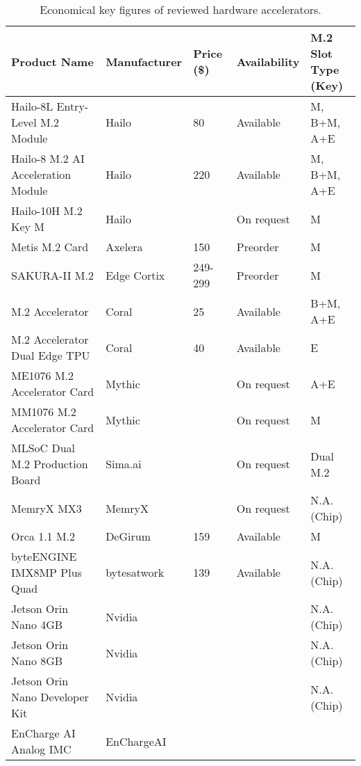 \begin{table}[!ht]
    \centering
    \begin{tabular}{|l|l|l|l|l|}
    \hline
        Product Name & Manufacturer & Price (\$) & Availability & \makecell{M.2 Slot\\Type (Key)} \\ \hline
        Hailo-8L Entry-Level M.2 Module & Hailo & 80 & Available & M, B+M, A+E \\ \hline
        Hailo-8 M.2 AI Acceleration Module & Hailo & 220 & Available & M, B+M, A+E \\ \hline
        Hailo-10H M.2 Key M & Hailo & ~ & On request & M \\ \hline
        Metis M.2 Card & Axelera & 150 & Preorder & M \\ \hline
        SAKURA-II M.2 & Edge Cortix & 249-299 & Preorder & M \\ \hline
        M.2 Accelerator & Coral & 25 & Available & B+M, A+E \\ \hline
        M.2 Accelerator Dual Edge TPU & Coral & 40 & Available & E \\ \hline
        ME1076 M.2 Accelerator Card & Mythic & ~ & On request & A+E \\ \hline
        MM1076 M.2 Accelerator Card & Mythic & ~ & On request & M \\ \hline
        MLSoC Dual M.2 Production Board & Sima.ai & ~ & On request & Dual M.2 \\ \hline
        MemryX MX3 & MemryX & ~ & On request & N.A.(Chip) \\ \hline
        Orca 1.1 M.2 & DeGirum & 159 & Available & M \\ \hline
        byteENGINE IMX8MP Plus Quad & bytesatwork & 139 & Available & N.A.(Chip) \\ \hline
        Jetson Orin Nano 4GB & Nvidia & ~ & ~ & N.A.(Chip) \\ \hline
        Jetson Orin Nano 8GB & Nvidia & ~ & ~ & N.A.(Chip) \\ \hline
        Jetson Orin Nano Developer Kit & Nvidia & ~ & ~ & N.A.(Chip) \\ \hline
        EnCharge AI Analog IMC & EnChargeAI & ~ & ~ & ~ \\ \hline
    \end{tabular}
    \caption{Economical key figures of reviewed hardware accelerators.}
    \label{tab:market:ecotable}
\end{table}

